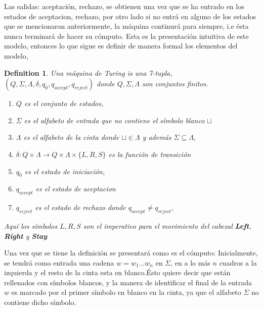 \documentclass[10pt]{report}
\newtheorem{definition}{Definition}
\begin{document}
    Las salidas: aceptación, rechazo, se obtienen una vez que se ha entrado en los estados de aceptacion, rechazo,
    por otro lado si no entrá en alguno de los estados que se mencionaron anteriormente, la máquina continurá para siempre, i.e
    ésta nunca terminará de hacer su cómputo.\newline
    Esta es la presentación intuitiva de este modelo, entonces lo que sigue es definir de manera formal los elementos del modelo,

    \newline

    \begin{definition}%
        Una máquina de Turing is una 7-tupla, $(Q,\Sigma,\Lambda,\delta,q_{0},q_{accept},q_{reject})$
        donde $Q,\Sigma,\Lambda$ son conjuntos finitos.
        \begin{enumerate}
            \item $Q$ es el conjunto de estados,
            \item $\Sigma$ es el alfabeto de entrada que no contiene el símbolo blanco $\sqcup$
            \item $\Lambda$ es el alfabeto de la cinta donde  $\sqcup\in\Lambda$ y además $\Sigma\subseteq\Lambda$,
            \item $\delta: Q\times\Lambda \rightarrow Q\times\Lambda\times\{L,R,S\}$ es la función de transición
            \item $q_{0}$ es el estado de iniciación,
            \item $q_{accept}$ es el estado de aceptacion
            \item $q_{reject}$ es el estado de rechazo donde $q_{accept} \neq q_{reject}$,

        \end{enumerate}
        Aquí los símbolos $L,R,S$ son el imperativo para el movimiento del cabezal \textbf{Left}, \textbf{Right} y \textbf{Stay}
    \end{definition}
    Una vez que se tiene la definición se presentará como es el cómputo:\newline
    Inicialmente, se tendrá como entrada una cadena $w = w_{1}\dots w_{n}$ en $\Sigma$, en a lo más $n$ cuadros
    a la izquierda y el resto de la cinta esta en blanco.Ésto quiere decir que están rellenados con símbolos blancos,
    y la manera de identificar el final de la entrada $w$ es marcado por el primer símbolo en blanco en la cinta,
    ya que el alfabeto $\Sigma$ no contiene dicho símbolo.
    \newline
\end{document}
